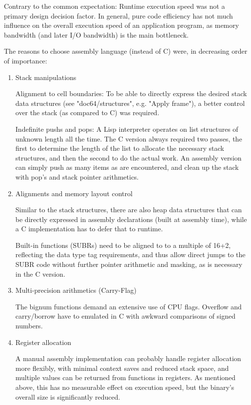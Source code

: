 Contrary to the common expectation: Runtime execution speed was not a
primary design decision factor. In general, pure code efficiency has
not much influence on the overall execution speed of an application
program, as memory bandwidth (and later I/O bandwidth) is the main
bottleneck.

The reasons to choose assembly language (instead of C) were, in
decreasing order of importance:

\begin{enumerate}
\item  Stack manipulations

      Alignment to cell boundaries: To be able to directly express the desired
      stack data structures (see "doc64/structures", e.g. "Apply frame"), a
      better control over the stack (as compared to C) was required.

      Indefinite pushs and pops: A Lisp interpreter operates on list structures
      of unknown length all the time. The C version always required two passes,
      the first to determine the length of the list to allocate the necessary
      stack structures, and then the second to do the actual work. An assembly
      version can simply push as many items as are encountered, and clean up the
      stack with pop's and stack pointer arithmetics.

\item Alignments and memory layout control

      Similar to the stack structures, there are also heap data structures that
      can be directly expressed in assembly declarations (built at assembly
      time), while a C implementation has to defer that to runtime.

      Built-in functions (SUBRs) need to be aligned to to a multiple of 16+2,
      reflecting the data type tag requirements, and thus allow direct jumps to
      the SUBR code without further pointer arithmetic and masking, as is
      necessary in the C version.

\item  Multi-precision arithmetics (Carry-Flag)

      The bignum functions demand an extensive use of CPU flags. Overflow and
      carry/borrow have to emulated in C with awkward comparisons of signed
      numbers.

\item  Register allocation

      A manual assembly implementation can probably handle register allocation
      more flexibly, with minimal context saves and reduced stack space, and
      multiple values can be returned from functions in registers. As mentioned
      above, this has no measurable effect on execution speed, but the binary's
      overall size is significantly reduced.


\end{enumerate}
